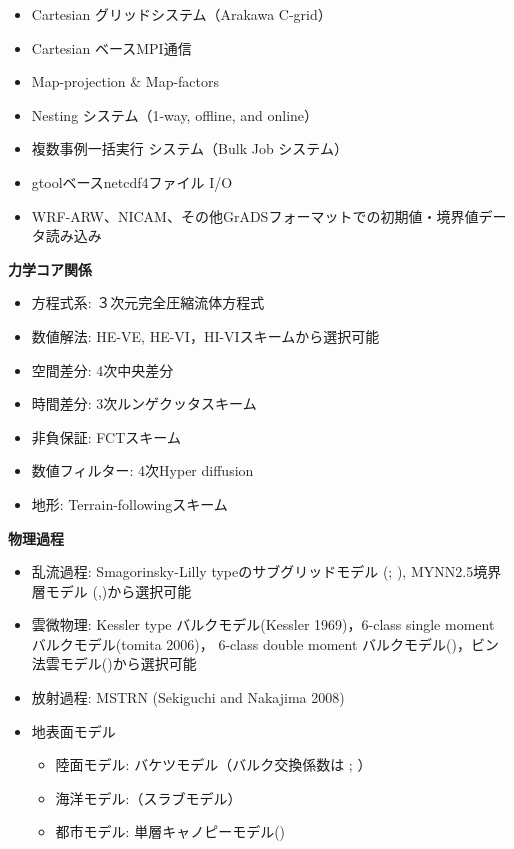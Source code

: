 
\begin{itemize}
 \item Cartesian グリッドシステム（Arakawa C-grid）
 \item Cartesian ベースMPI通信
 \item Map-projection \& Map-factors
 \item Nesting システム（1-way, offline, and online）
 \item 複数事例一括実行 システム（Bulk Job システム）
 \item gtoolベースnetcdf4ファイル I/O
 \item WRF-ARW、NICAM、その他GrADSフォーマットでの初期値・境界値データ読み込み
\end{itemize}

{\bf 力学コア関係}

\begin{itemize}
 \item 方程式系: ３次元完全圧縮流体方程式
 \item 数値解法: HE-VE,  HE-VI，HI-VIスキームから選択可能
 \item 空間差分: 4次中央差分
 \item 時間差分: 3次ルンゲクッタスキーム
 \item 非負保証: FCTスキーム
 \item 数値フィルター: 4次Hyper diffusion
 \item 地形: Terrain-followingスキーム
\end{itemize}

{\bf 物理過程}

\begin{itemize}
 \item 乱流過程: Smagorinsky-Lilly typeのサブグリッドモデル (\cite{smagorinsky_1963}; \cite{lilly_1962}), 
MYNN2.5境界層モデル (\cite{my_1982},\cite{nakanishi_2004})から選択可能
 \item 雲微物理: Kessler type バルクモデル(Kessler 1969)，6-class single moment バルクモデル(tomita 2006)，
6-class double moment バルクモデル(\cite{sn_2014})，ビン法雲モデル(\cite{suzuki_etal_2010})から選択可能
 \item 放射過程: MSTRN (Sekiguchi and Nakajima 2008)
 \item 地表面モデル
  \begin{itemize}
   \item 陸面モデル: バケツモデル（バルク交換係数は \cite{beljaars_1991}; \cite{wilson_2001}）
   \item 海洋モデル:（スラブモデル）
   \item 都市モデル: 単層キャノピーモデル(\cite{kusaka_2001})
  \end{itemize}
\end{itemize}

